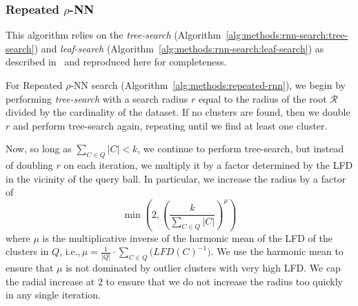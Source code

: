 \subsubsection{Repeated \texorpdfstring{$\rho$}{p}-NN}
\label{sec:methods:knn-search:repeated-rnn}

This algorithm relies on the \textit{tree-search} (Algorithm~\ref{alg:methods:rnn-search:tree-search}) and \textit{leaf-search} (Algorithm~\ref{alg:methods:rnn-search:leaf-search}) as described in~\cite{ishaq2019clustered} and reproduced here for completeness.

For Repeated $\rho$-NN search (Algorithm~\ref{alg:methods:repeated-rnn}), we begin by performing \textit{tree-search} with a search radius $r$ equal to the radius of the root $\mathcal{R}$ divided by the cardinality of the dataset.
If no clusters are found, then we double $r$ and perform tree-search again, repeating until we find at least one cluster.

Now, so long as $\sum_{C \in Q} |C| < k$, we continue to perform tree-search, but instead of doubling $r$ on each iteration, we multiply it by a factor determined by the LFD in the vicinity of the query ball.
In particular, we increase the radius by a factor of
\begin{equation}
    \min \left(2, \left( {\frac{k}{\sum_{C \in Q} |C|}} \right)^{\mu} \right)
    \label{eq:methods:repeated-rnn-factor}
\end{equation}
where $\mu$ is the multiplicative inverse of the harmonic mean of the LFD of the clusters in $Q$, i.e.,\,$\mu = \frac{1}{|Q|} \cdot \sum_{C \in Q} \big( LFD(C)^{-1} \big)$.
We use the harmonic mean to ensure that $\mu$ is not dominated by outlier clusters with very high LFD.
We cap the radial increase at 2 to ensure that we do not increase the radius too quickly in any single iteration.

